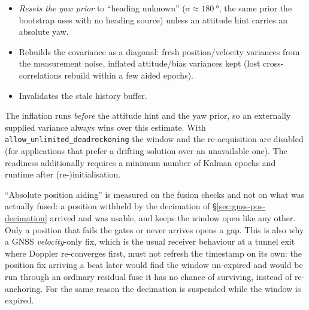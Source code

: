 \documentclass[11pt,a4paper]{article}
\newcommand{\code}[1]{\texttt{#1}}
\begin{document}
\begin{itemize}
        computed once from the known elapsed time and capped at the
        configured initial priors, so a re-acquisition after an
        arbitrarily long outage is at worst as uncertain as a cold
        start, never worse.
  \item \emph{Resets the yaw \emph{prior}} to ``heading unknown''
        ($\sigma \approx \SI{180}{\degree}$, the same prior the bootstrap
        uses with no heading source) unless an attitude hint carries an
        absolute yaw.
  \item Rebuilds the covariance as a diagonal: fresh position/velocity
        variances from the measurement noise, inflated attitude/bias
        variances kept (lost cross-correlations rebuild within a few
        aided epochs).
  \item Invalidates the stale history buffer.
\end{itemize}
The inflation runs \emph{before} the attitude hint and the yaw prior, so
an externally supplied variance always wins over this estimate.
With \code{allow\_\allowbreak{}unlimited\_\allowbreak{}deadreckoning} the window and the
re-acquisition are disabled (for applications that prefer a drifting
solution over an unavailable one). The readiness additionally requires a
minimum number of Kalman epochs and runtime after (re-)initialisation.

``Absolute position aiding'' is measured on the fusion checks and not on what was
actually fused: a position withheld by the decimation of
\S\ref{sec:gnss-pos-decimation} arrived and was usable, and keeps the window
open like any other. Only a position that fails the gates or never arrives opens
a gap. This is also why a GNSS \emph{velocity}-only fix, which is the usual
receiver behaviour at a tunnel exit where Doppler re-converges first, must not
refresh the timestamp on its own: the position fix arriving a beat later would
find the window un-expired and would be run through an ordinary residual fuse it
has no chance of surviving, instead of re-anchoring. For the same reason the
decimation is suspended while the window is expired.
\end{document}
